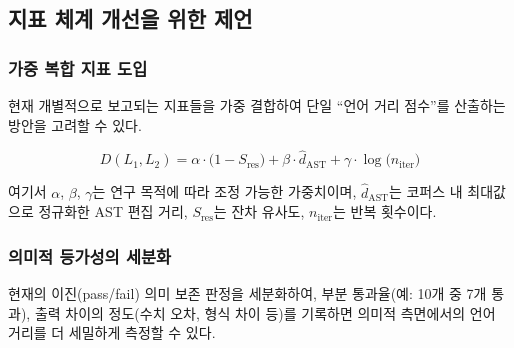 \subsection{지표 체계 개선을 위한 제언}\label{ssec:rec-metrics}

\subsubsection{가중 복합 지표 도입}\label{sssec:composite-metric}

현재 개별적으로 보고되는 지표들을 가중 결합하여 단일 ``언어 거리 점수''를
산출하는 방안을 고려할 수 있다.

\begin{equation}\label{eq:composite}
  D(L_1, L_2)
    = \alpha \cdot \bigl(1 - S_{\mathrm{res}}\bigr)
    + \beta  \cdot \hat{d}_{\mathrm{AST}}
    + \gamma \cdot \log\!\bigl(n_{\mathrm{iter}}\bigr)
\end{equation}

여기서 $\alpha$, $\beta$, $\gamma$는 연구 목적에 따라 조정 가능한 가중치이며,
$\hat{d}_{\mathrm{AST}}$는 코퍼스 내 최대값으로 정규화한 AST 편집 거리,
$S_{\mathrm{res}}$는 잔차 유사도, $n_{\mathrm{iter}}$는 반복 횟수이다.

\subsubsection{의미적 등가성의 세분화}\label{sssec:semantic-granularity}

현재의 이진(pass/fail) 의미 보존 판정을 세분화하여, 부분 통과율(예: 10개 중 7개
통과), 출력 차이의 정도(수치 오차, 형식 차이 등)를 기록하면 의미적 측면에서의
언어 거리를 더 세밀하게 측정할 수 있다.

